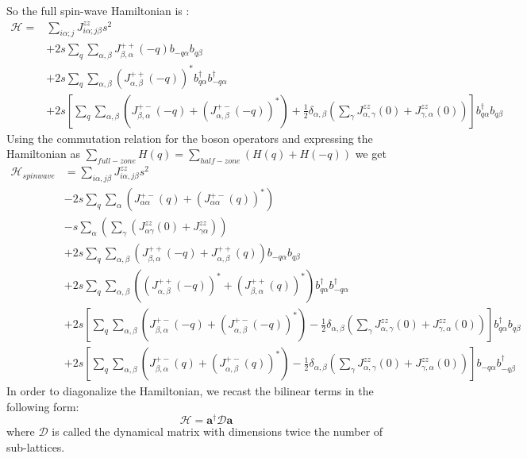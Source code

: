 So the full spin-wave Hamiltonian is :
\begin{equation}
\begin{split}
\mathcal{H} = &\sum_{i\alpha;j}^{}J^{zz}_{i\alpha;j\beta}s^2\\
&+2s\sum_{q}^{}\sum_{\alpha,\beta}^{}J^{++}_{\beta,\alpha}(-q)b_{-q\alpha}b_{q\beta}\\
&+2s\sum_{q}^{}\sum_{\alpha,\beta}^{}(J_{\alpha,\beta}^{++}(-q))^*b^\dagger_{q\alpha}b^\dagger_{-q\alpha}\\
&+2s[\sum_{q}^{}\sum_{\alpha,\beta}^{}(J^{+-}_{\beta,\alpha}(-q) + (J^{+-}_{\alpha,\beta}(-q))^*) + \frac{1}{2}\delta_{\alpha,\beta}(\sum_{\gamma}^{}J^{zz}_{\alpha,\gamma}(0) + J^{zz}_{\gamma,\alpha}(0)) ]b^\dagger_{q\alpha}b_{q\beta}
\end{split}
\end{equation}
Using the commutation relation for the boson operators and expressing the Hamiltonian as $ \sum_{full-zone}^{}H(q) = \sum_{half-zone}^{}(H(q) + H(-q)) $ we get
\begin{equation}
	\begin{split}
		\mathcal{H}_{spinwave} &= \sum_{i\alpha,j\beta}^{}J^{zz}_{i\alpha,j\beta}s^2\\
		&-2s\sum_{q}^{}\sum_{\alpha}^{}(J^{+-}_{\alpha \alpha}(q) + (J^{+-}_{\alpha \alpha}(q))^* )\\
		&-s\sum_{\alpha}^{}\left( \sum_{\gamma}^{} (J^{zz}_{\alpha \gamma}(0) + J^{zz}_{\gamma \alpha}) \right)\\
		&+2s\sum_{q}^{}\sum_{\alpha,\beta}^{}\left(J^{++}_{\beta,\alpha}(-q) + J^{++}_{\alpha, \beta}(q) \right)b_{-q\alpha}b_{q\beta}\\
		&+2s\sum_{q}^{}\sum_{\alpha,\beta}^{}\left((J_{\alpha,\beta}^{++}(-q))^* + (J_{\beta,\alpha}^{++}(q))^* \right)b^\dagger_{q\alpha}b^\dagger_{-q\alpha}\\
		&+2s[\sum_{q}^{}\sum_{\alpha,\beta}^{}(J^{+-}_{\beta,\alpha}(-q) + (J^{+-}_{\alpha,\beta}(-q))^*) - \frac{1}{2}\delta_{\alpha,\beta}(\sum_{\gamma}^{}J^{zz}_{\alpha,\gamma}(0) + J^{zz}_{\gamma,\alpha}(0)) ]b^\dagger_{q\alpha}b_{q\beta}\\
		&+2s[\sum_{q}^{}\sum_{\alpha,\beta}^{}(J^{+-}_{\beta,\alpha}(q) + (J^{+-}_{\alpha,\beta}(q))^*) - \frac{1}{2}\delta_{\alpha,\beta}(\sum_{\gamma}^{}J^{zz}_{\alpha,\gamma}(0) + J^{zz}_{\gamma,\alpha}(0)) ]b_{-q\alpha}b^\dagger_{-q\beta}
	\end{split}
\end{equation}
In order to diagonalize the Hamiltonian, we recast the bilinear terms in the following form:
\begin{equation}
	\mathcal{H} = \textbf{a}^\dagger\mathcal{D}\textbf{a}
\end{equation}
where $ \mathcal{D} $ is called the dynamical matrix with dimensions twice the number of sub-lattices.

